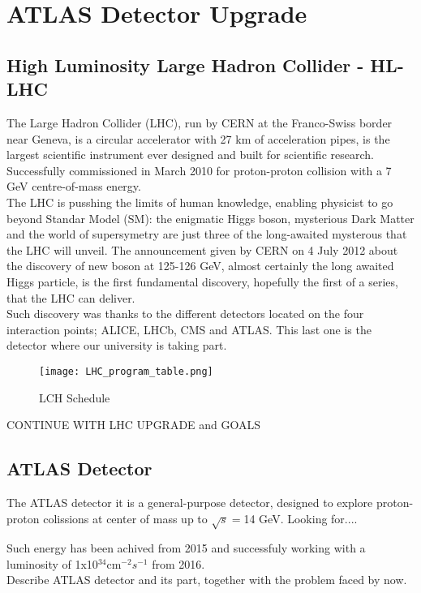 \section{ATLAS Detector Upgrade}

\subsection{High Luminosity Large Hadron Collider - HL-LHC}
The Large Hadron Collider (LHC), run by CERN at the Franco-Swiss border near Geneva, is a circular accelerator with 27 km of acceleration pipes, is the largest scientific instrument ever designed and built for scientific research. Successfully commissioned in March 2010 for proton-proton collision with a 7 GeV centre-of-mass energy.\\
The LHC is pusshing the limits of human knowledge, enabling physicist to go beyond Standar Model (SM): the enigmatic Higgs boson, mysterious Dark Matter and the world of supersymetry are just three of the long-awaited mysterous that the LHC will unveil. The announcement given by CERN on 4 July 2012 about the discovery of new boson at 125-126 GeV, almost certainly the long awaited Higgs particle, is the first fundamental discovery, hopefully the first of a series, that the LHC can deliver.\\
Such discovery was thanks to the different detectors located on the four interaction points; ALICE, LHCb, CMS and ATLAS. This last one is the detector where our university is taking part.\\
\begin{figure}[ht]
		\centering
		\texttt{[image: LHC\_program\_table.png]}
		\caption{LCH Schedule}\label{fig:a}
\end{figure}
\par
CONTINUE WITH LHC UPGRADE and GOALS

\subsection{ATLAS Detector}
The ATLAS detector it is a general-purpose detector, designed to explore proton-proton colissions at center of mass up to $\sqrt{s}=$14 GeV. Looking for.... \par
Such energy has been achived from 2015 and successfuly working with a luminosity of 1x10$^{34}$cm$^{-2}s^{-1}$ from 2016.\\

Describe ATLAS detector and its part, together with the problem faced by now.\par


